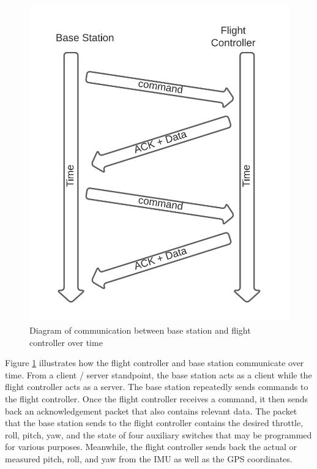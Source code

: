 \documentclass[english]{upeeei}
\begin{document}
\begin{figure}[h]
    \centering
    \includegraphics[scale=0.6]{images/commsSetup.png}
    \caption{Diagram of communication between base station and flight controller over time}
    \label{fig:commsSetup}
\end{figure}
\newline
\newline
Figure \ref{fig:commsSetup} illustrates how the flight controller and base station communicate over time. From a client / server standpoint, the
base station acts as a client while the flight controller acts as a server. The base station repeatedly sends commands to the flight controller.
Once the flight controller receives a command, it then sends back an acknowledgement packet that also contains relevant data. The packet that the
base station sends to the flight controller contains the desired throttle, roll, pitch, yaw, and the state of four auxiliary switches that may be
programmed for various purposes. Meanwhile, the flight controller sends back the actual or measured pitch, roll, and yaw from the IMU as well as
the GPS coordinates.
\end{document}
